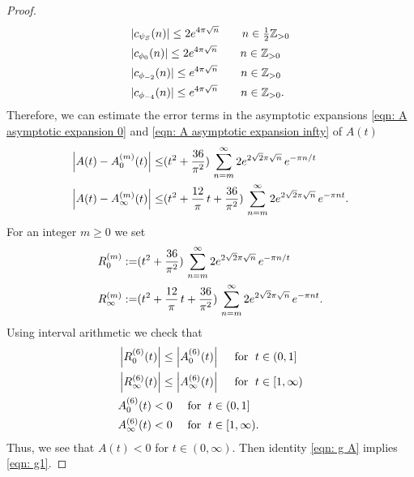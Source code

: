 \begin{proof}
\begin{align}\label{eqn: Fourier estimate 2}
&|c_{\psi_S}(n)|\leq 2e^{4\pi\sqrt{n}}\qquad n\in\tfrac 12 \mathbb{Z}_{>0} \\
&|c_{\phi_0}(n)|\leq 2e^{4\pi\sqrt{n}}\qquad n\in \mathbb{Z}_{>0} \\
&|c_{\phi_{-2}}(n)|\leq e^{4\pi\sqrt{n}}\qquad n\in  \mathbb{Z}_{>0} \\
&|c_{\phi_{-4}}(n)|\leq e^{4\pi\sqrt{n}}\qquad n\in \mathbb{Z}_{>0}. \label{eqn: Fourier estimate 5}
  \end{align}
Therefore, we can estimate the error terms in the asymptotic expansions \eqref{eqn: A asymptotic expansion 0} and \eqref{eqn: A asymptotic expansion infty} of $A(t)$
\begin{align}
\left|A(t)-A_0^{(m)}(t)\right|\leq& (t^2+\frac{36}{\pi^2})\,\sum_{n=m}^\infty 2e^{2\sqrt{2}\pi\sqrt{n}}\,e^{-\pi n/t}\notag\\
\left|A(t)-A_\infty^{(m)}(t)\right|\leq& (t^2+\frac{12}{\pi}\,t+\frac{36}{\pi^2})\,\sum_{n=m}^\infty 2e^{2\sqrt{2}\pi\sqrt{n}}\,e^{-\pi nt}.\notag
\end{align}
  For an integer $m\geq0$ we set
\begin{align}
R^{(m)}_0:=&(t^2+\frac{36}{\pi^2})\,\sum_{n=m}^\infty 2e^{2\sqrt{2}\pi\sqrt{n}}\,e^{-\pi n/t}\notag\\
R^{(m)}_\infty:=&(t^2+\frac{12}{\pi}\,t+\frac{36}{\pi^2})\,\sum_{n=m}^\infty 2e^{2\sqrt{2}\pi\sqrt{n}}\,e^{-\pi nt}.\notag
\end{align}
Using interval arithmetic we check that
\begin{align}
&\left|R_0^{(6)}(t)\right|\leq\left|A_0^{(6)}(t)\right|\quad\mbox{ for }\;t\in(0,1]\notag\\
&\left|R_\infty^{(6)}(t)\right|\leq\left|A_\infty^{(6)}(t)\right|\quad\mbox{ for }\;t\in[1,\infty)\notag\\
&A_0^{(6)}(t)<0\quad\mbox{ for }\;t\in(0,1]\notag\\
&A_\infty^{(6)}(t)<0\quad\mbox{ for }\;t\in[1,\infty).\notag
\end{align}
Thus, we see that $A(t)<0$ for $t\in (0,\infty)$. Then identity \eqref{eqn: g A} implies \eqref{eqn: g1}.



\end{proof}
